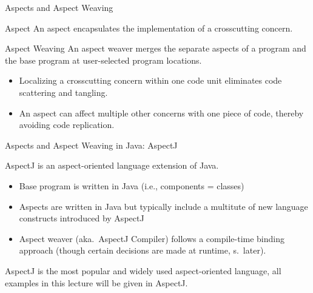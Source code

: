 \begin{frame}{Aspects and Aspect Weaving}
	\begin{mycolumns}[widths={50,50},animation=none]
		\begin{definition}{Aspect }
			An aspect encapsulates the implementation of a crosscutting concern.
		\end{definition}
		\begin{definition}{Aspect Weaving }
			An aspect weaver merges the separate aspects of a program and the base program at user-selected program locations.
		\end{definition}
		\begin{note}{}
			\begin{itemize}
				\item Localizing a crosscutting concern within one code unit eliminates code scattering and tangling.
				\item An aspect can affect multiple other concerns with one piece of code, thereby avoiding code replication.
			\end{itemize}
		\end{note}
	\mynextcolumn
		\begin{exampletight}{}
			\centering
		\end{exampletight}
	\end{mycolumns}
\end{frame}

\begin{frame}{Aspects and Aspect Weaving in Java: AspectJ}
	\begin{mycolumns}[widths={50,50},animation=none]
		\begin{definition}{}
			AspectJ is an aspect-oriented language extension of Java.
			\begin{itemize}
				\item Base program is written in Java (i.e., components = classes)
				\item Aspects are written in Java but typically include a multitute of new language constructs introduced by AspectJ
				\item Aspect weaver (aka.\ AspectJ Compiler) follows a compile-time binding approach (though certain decisions are made at runtime, s.\ later).
			\end{itemize}
		\end{definition}
		\begin{note}{}
			AspectJ is the most popular and widely used aspect-oriented language, all examples in this lecture will be given in AspectJ.
		\end{note}
	\mynextcolumn
		\begin{exampletight}{}
			\centering
			\pic[width=1.0\linewidth]{aspect-weaving}
		\end{exampletight}
	\end{mycolumns}
\end{frame}

